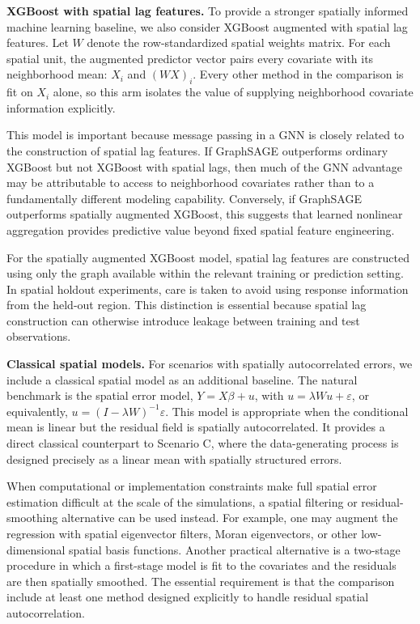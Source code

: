 \documentclass[ASNA, twocolumn]{USG} %
\begin{document}
\noindent \textbf{XGBoost with spatial lag features.}
To provide a stronger spatially informed machine learning baseline, we also consider XGBoost augmented with spatial lag features. Let \(W\) denote the row-standardized spatial weights matrix. For each spatial unit, the augmented predictor vector pairs every covariate with its neighborhood mean: $X_i$ and $(WX)_i$. Every other method in the comparison is fit on $X_i$ alone, so this arm isolates the value of supplying neighborhood covariate information explicitly.

This model is important because message passing in a GNN is closely related to the construction of spatial lag features. If GraphSAGE outperforms ordinary XGBoost but not XGBoost with spatial lags, then much of the GNN advantage may be attributable to access to neighborhood covariates rather than to a fundamentally different modeling capability. Conversely, if GraphSAGE outperforms spatially augmented XGBoost, this suggests that learned nonlinear aggregation provides predictive value beyond fixed spatial feature engineering.

For the spatially augmented XGBoost model, spatial lag features are constructed using only the graph available within the relevant training or prediction setting. In spatial holdout experiments, care is taken to avoid using response information from the held-out region. This distinction is essential because spatial lag construction can otherwise introduce leakage between training and test observations.

\noindent \textbf{Classical spatial models.}
For scenarios with spatially autocorrelated errors, we include a classical spatial model as an additional baseline. The natural benchmark is the spatial error model, $Y = X\beta + u$, with $u = \lambda W u + \varepsilon$, or equivalently,
$u = (I-\lambda W)^{-1}\varepsilon$.
This model is appropriate when the conditional mean is linear but the residual field is spatially autocorrelated. It provides a direct classical counterpart to Scenario C, where the data-generating process is designed precisely as a linear mean with spatially structured errors.

When computational or implementation constraints make full spatial error estimation difficult at the scale of the simulations, a spatial filtering or residual-smoothing alternative can be used instead. For example, one may augment the regression with spatial eigenvector filters, Moran eigenvectors, or other low-dimensional spatial basis functions. Another practical alternative is a two-stage procedure in which a first-stage model is fit to the covariates and the residuals are then spatially smoothed. The essential requirement is that the comparison include at least one method designed explicitly to handle residual spatial autocorrelation.
\end{document}
